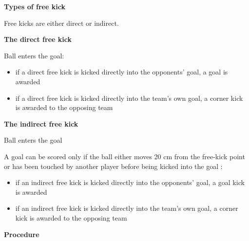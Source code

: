 \clearpage
\sffamily
{\bfseries\color[rgb]{0.4,0.4,0.4}{Law 13 -- Free Kicks} }
{}

\bigskip

{\bfseries Types of free kick}

\headlinebox

Free kicks are either direct or indirect.

\bigskip

{\bfseries The direct free kick }

\headlinebox

Ball enters the goal:

\begin{itemize}
\item if a direct free kick is kicked directly into the
opponents{\textquoteright} goal, a goal is awarded
\item if a direct free kick is kicked directly into the team's own goal, a corner kick is awarded to the opposing team
\end{itemize}

\bigskip

{\bfseries The indirect free kick}

\headlinebox



\bigskip

Ball enters the goal

A goal can be scored only if the ball either moves 20 cm from the free-kick point or has been touched by another player before being kicked into the goal :

\begin{itemize}
\item if an indirect free kick is kicked directly into the
opponents' goal, a goal kick is awarded
\item if an indirect free kick is kicked directly into the
team's own goal, a corner kick is awarded to the
opposing team
\end{itemize}

\bigskip

{\bfseries Procedure}

